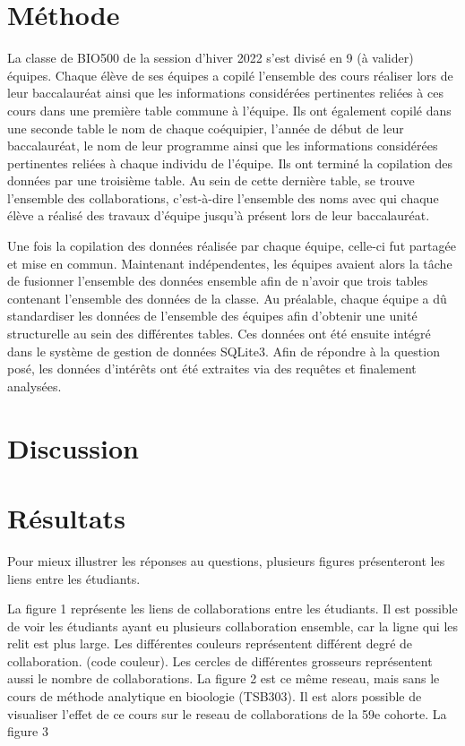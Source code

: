 \documentclass[9pt,twocolumn,twoside,]{pnas-new}
\begin{document}
\hypertarget{muxe9thode}{%
\section{Méthode}\label{muxe9thode}}

La classe de BIO500 de la session d'hiver 2022 s'est divisé en 9 (à
valider) équipes. Chaque élève de ses équipes a copilé l'ensemble des
cours réaliser lors de leur baccalauréat ainsi que les informations
considérées pertinentes reliées à ces cours dans une première table
commune à l'équipe. Ils ont également copilé dans une seconde table le
nom de chaque coéquipier, l'année de début de leur baccalauréat, le nom
de leur programme ainsi que les informations considérées pertinentes
reliées à chaque individu de l'équipe. Ils ont terminé la copilation des
données par une troisième table. Au sein de cette dernière table, se
trouve l'ensemble des collaborations, c'est-à-dire l'ensemble des noms
avec qui chaque élève a réalisé des travaux d'équipe jusqu'à présent
lors de leur baccalauréat.

Une fois la copilation des données réalisée par chaque équipe, celle-ci
fut partagée et mise en commun. Maintenant indépendentes, les équipes
avaient alors la tâche de fusionner l'ensemble des données ensemble afin
de n'avoir que trois tables contenant l'ensemble des données de la
classe. Au préalable, chaque équipe a dû standardiser les données de
l'ensemble des équipes afin d'obtenir une unité structurelle au sein des
différentes tables. Ces données ont été ensuite intégré dans le système
de gestion de données SQLite3. Afin de répondre à la question posé, les
données d'intérêts ont été extraites via des requêtes et finalement
analysées.

\hypertarget{discussion}{%
\section{Discussion}\label{discussion}}

\hypertarget{ruxe9sultats}{%
\section{Résultats}\label{ruxe9sultats}}

Pour mieux illustrer les réponses au questions, plusieurs figures
présenteront les liens entre les étudiants.

La figure 1 représente les liens de collaborations entre les étudiants.
Il est possible de voir les étudiants ayant eu plusieurs collaboration
ensemble, car la ligne qui les relit est plus large. Les différentes
couleurs représentent différent degré de collaboration. (code couleur).
Les cercles de différentes grosseurs représentent aussi le nombre de
collaborations. La figure 2 est ce même reseau, mais sans le cours de
méthode analytique en bioologie (TSB303). Il est alors possible de
visualiser l'effet de ce cours sur le reseau de collaborations de la 59e
cohorte. La figure 3
\end{document}

